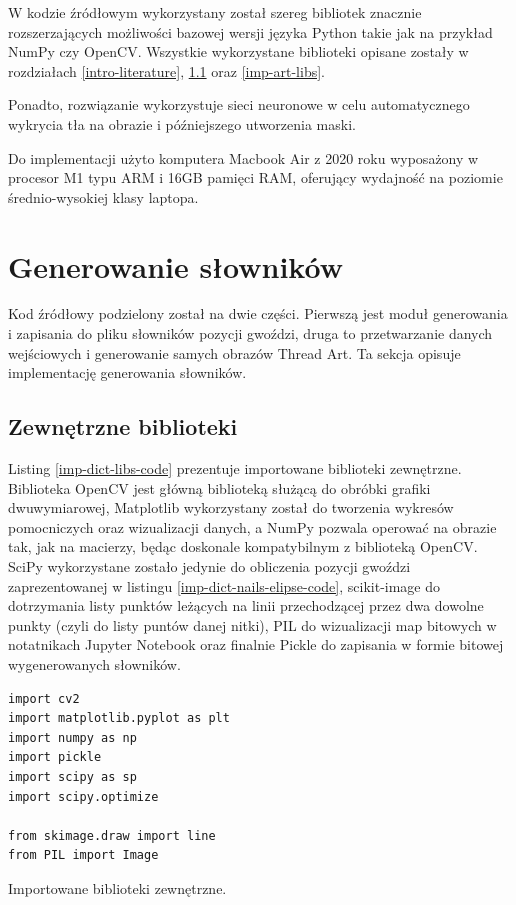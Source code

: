     W kodzie źródłowym wykorzystany został szereg bibliotek znacznie rozszerzających możliwości bazowej wersji języka Python takie jak na przykład NumPy czy OpenCV. Wszystkie wykorzystane biblioteki opisane zostały w rozdziałach \ref{intro-literature}, \ref{imp-dict-libs} oraz \ref{imp-art-libs}.
    
    Ponadto, rozwiązanie wykorzystuje sieci neuronowe w celu automatycznego wykrycia tła na obrazie i późniejszego utworzenia maski.
    
    Do implementacji użyto komputera Macbook Air z 2020 roku wyposażony w procesor M1 typu ARM i 16GB pamięci RAM, oferujący wydajność na poziomie średnio-wysokiej klasy laptopa.
    
    \section{Generowanie słowników} \label{imp-dict}
    Kod źródłowy podzielony został na dwie części. Pierwszą jest moduł generowania i zapisania do pliku słowników pozycji gwoździ, druga to przetwarzanie danych wejściowych i generowanie samych obrazów Thread Art. Ta sekcja opisuje implementację generowania słowników.
    
        \subsection{Zewnętrzne biblioteki} \label{imp-dict-libs}
        Listing \ref{imp-dict-libs-code} prezentuje importowane biblioteki zewnętrzne. Biblioteka OpenCV jest główną biblioteką służącą do obróbki grafiki dwuwymiarowej, Matplotlib wykorzystany został do tworzenia wykresów pomocniczych oraz wizualizacji danych, a NumPy pozwala operować na obrazie tak, jak na macierzy, będąc doskonale kompatybilnym z biblioteką OpenCV. SciPy wykorzystane zostało jedynie do obliczenia pozycji gwoździ zaprezentowanej w listingu \ref{imp-dict-nails-elipse-code}, scikit-image do dotrzymania listy punktów leżących na linii przechodzącej przez dwa dowolne punkty (czyli do listy puntów danej nitki), PIL do wizualizacji map bitowych w notatnikach Jupyter Notebook oraz finalnie Pickle do zapisania w formie bitowej wygenerowanych słowników.
        \begin{code}[H]
        \begin{verbatim}
import cv2
import matplotlib.pyplot as plt
import numpy as np
import pickle
import scipy as sp
import scipy.optimize

from skimage.draw import line
from PIL import Image
        \end{verbatim}
        \caption{Importowane biblioteki zewnętrzne.}
        \label{imp-dict-libs-code}
        \end{code}
        
